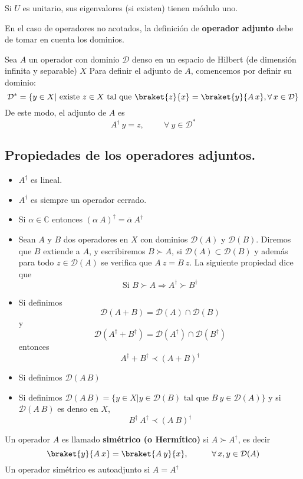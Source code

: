 \begin{lema}
Si $U$ es unitario, sus eigenvalores (si existen) tienen módulo uno.
\end{lema}
En el caso de operadores no acotados, la definición de \textbf{operador adjunto} debe de tomar en cuenta los dominios.
\par
Sea $A$ un operador con dominio $\mathcal{D}$ denso en un espacio de Hilbert (de dimensión infinita y separable) $X$ Para definir el adjunto de $A$, comencemos por definir su dominio:
\[ \mathcal{D}^{*} = \{ y \in X \vert \mbox{ existe } z \in X \mbox{ tal que } \braket{z}{x} = \braket{y}{A \, x}, \forall \, x \in \mathcal{D} \} \]
De este modo, el adjunto de $A$ es
\[ A^{\dagger} \: y = z, \hspace{1cm} \forall \: y \in \mathcal{D^{*}} \]
\subsection*{Propiedades de los operadores adjuntos.}
\begin{itemize}
\item $A^{\dagger}$ es lineal.
\item $A^{\dagger}$ es siempre un operador cerrado.
\item Si $\alpha \in \mathbb{C}$ entonces $(\alpha \: A)^{\dagger} =  \overline{\alpha} \: A^{\dagger}$
\item Sean $A$ y $B$ dos operadores en $X$ con dominios $\mathcal{D}(A)$ y $\mathcal{D}(B)$. Diremos que $B$ extiende a $A$, y escribiremos $B \succ A$, si $\mathcal{D}(A) \subset \mathcal{D}(B)$ y además para todo $z \in \mathcal{D}(A)$ se verifica que $A \: z = B \: z$. La siguiente propiedad dice que
\[ \mbox{Si } B \succ  A \Rightarrow  A^{\dagger} \succ  B^{\dagger} \]
\item Si definimos 
\[ \mathcal{D} (A + B) = \mathcal{D}(A) \cap \mathcal{D}(B)\]
y
\[ \mathcal{D} (A^{\dagger} + B^{\dagger}) = \mathcal{D}(A^{\dagger}) \cap \mathcal{D}(B^{\dagger}) \]
entonces
\[ A^{\dagger} + B^{\dagger} \prec (A + B)^{\dagger}  \]
\item Si definimos $\mathcal{D}(A \, B)$
\item Si definimos $\mathcal{D} (A \, B) = \{ y \in X \vert y \in \mathcal{D}(B) \mbox{ tal que } B \: y \in \mathcal{D}(A) \}$ y si $\mathcal{D}(A \: B)$ es denso en $X$,
\[ B^{\dagger} \: A^{\dagger} \prec (A \: B)^{\dagger} \]
\end{itemize}
\begin{defi}
Un operador $A$ es llamado \textbf{simétrico (o Hermítico)} si $A \succ A^{\dagger}$, es decir
\[ \braket{y}{A \: x} = \braket{A \: y}{x}, \hspace{1cm} \forall \, x, y \in \mathcal{D}(A) \]
Un operador simétrico es autoadjunto si $A = A^{\dagger}$
\end{defi}
